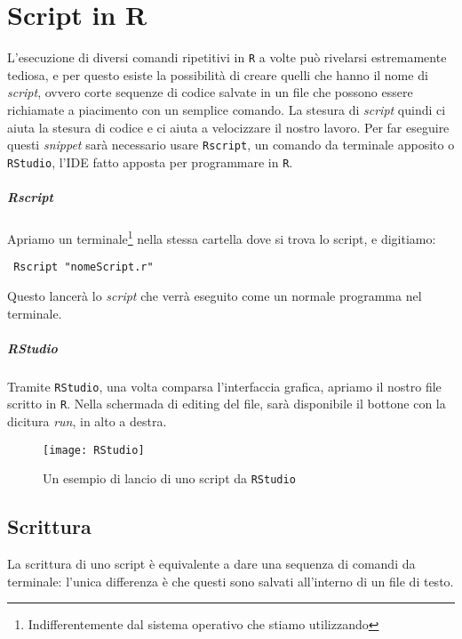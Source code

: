 \chapter{Script in R}

L'esecuzione di diversi comandi ripetitivi in \texttt{R} a volte può rivelarsi 
estremamente tediosa, e per questo esiste la possibilità di creare quelli che 
hanno il nome di \textit{script}, ovvero corte sequenze di codice salvate in un 
file che possono essere richiamate a piacimento con un semplice comando.
La stesura di \textit{script} quindi ci aiuta la stesura di codice e ci aiuta a 
velocizzare il nostro lavoro. Per far eseguire questi \textit{snippet} sarà 
necessario usare \texttt{Rscript}, un comando da terminale apposito o 
\texttt{RStudio}, l'IDE fatto apposta per programmare in \texttt{R}.

\paragraph*{Rscript} Apriamo un terminale\footnote{Indifferentemente dal 
sistema operativo che stiamo utilizzando} nella stessa cartella dove si trova 
lo script, e digitiamo:
\begin{lstlisting}
 Rscript "nomeScript.r"
\end{lstlisting}
Questo lancerà lo \textit{script} che verrà eseguito come un normale programma 
nel terminale.

\paragraph*{RStudio} Tramite \texttt{RStudio}, una volta comparsa l'interfaccia 
grafica, apriamo il nostro file scritto in \texttt{R}. Nella schermada di 
editing del file, sarà disponibile il bottone con la dicitura \textit{run}, in 
alto a destra.

\begin{figure}[h]
  \centering
  \texttt{[image: RStudio]}
  \caption{Un esempio di lancio di uno script da \texttt{RStudio}}
\end{figure}

\section{Scrittura}

La scrittura di uno script è equivalente a dare una sequenza di comandi da 
terminale: l'unica differenza è che questi sono salvati all'interno di un file 
di testo.
